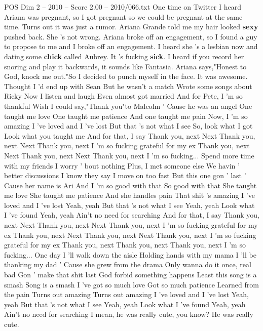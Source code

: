 \begin{textsample}{POS Dim 2 – 2010 – Score 2.00 – 2010/066.txt}  \label{ex:f2_pos_033}
One time on Twitter I heard Ariana was pregnant, so I got pregnant so we could be pregnant at the same time.
Turns out it was just a rumor.
Ariana Grande told me my hair looked \textbf{sexy} pushed back.
She 's not wrong.
Ariana broke off an engagement, so I found a guy to propose to me and I broke off an engagement.
I heard she 's a lesbian now and dating some \textbf{chick} called Aubrey.
It 's fucking \textbf{sick}.
I heard if you record her snoring and play it backwards, it sounds like Fantasia.
Ariana says,"Honest to God, knock me out."So I decided to punch myself in the face.
It was awesome.
Thought I 'd end up with Sean But he wasn't a match Wrote some songs about Ricky Now I listen and laugh Even almost got married And for Pete, I 'm so thankful Wish I could say,"Thank you"to Malcolm ' Cause he was an angel One taught me love One taught me patience And one taught me pain Now, I 'm so amazing I 've loved and I 've lost But that 's not what I see So, look what I got Look what you taught me And for that, I say Thank you, next Next Thank you, next Next Thank you, next I 'm so fucking grateful for my ex Thank you, next Next Thank you, next Next Thank you, next I 'm so fucking...
Spend more time with my friends I worry ' bout nothing Plus, I met someone else We havin ' better discussions I know they say I move on too fast But this one gon ' last ' Cause her name is Ari And I 'm so good with that So good with that She taught me love She taught me patience And she handles pain That shit 's amazing I 've loved and I 've lost Yeah, yeah But that 's not what I see Yeah, yeah Look what I 've found Yeah, yeah Ain't no need for searching And for that, I say Thank you, next Next Thank you, next Next Thank you, next I 'm so fucking grateful for my ex Thank you, next Next Thank you, next Next Thank you, next I 'm so fucking grateful for my ex Thank you, next Thank you, next Thank you, next I 'm so fucking...
One day I 'll walk down the aisle Holding hands with my mama I 'll be thanking my dad ' Cause she grew from the drama Only wanna do it once, real bad Gon ' make that shit last God forbid something happens Least this song is a smash Song is a smash I 've got so much love Got so much patience Learned from the pain Turns out amazing Turns out amazing I 've loved and I 've lost Yeah, yeah But that 's not what I see Yeah, yeah Look what I 've found Yeah, yeah Ain't no need for searching I mean, he was really cute, you know?
He was really cute.

\end{textsample}
